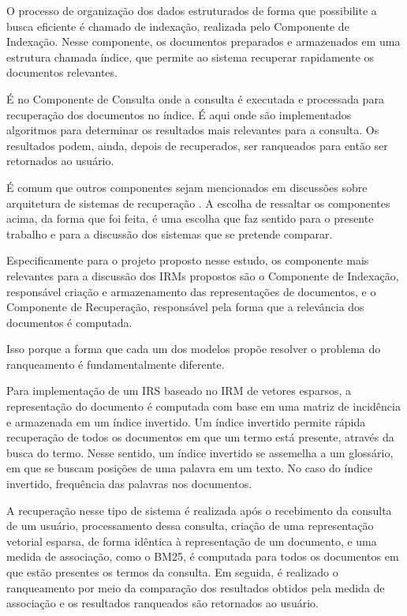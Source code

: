 \documentclass[
	12pt,				%
	openright,			%
	oneside,			%
	a4paper,			%
	english,			%
	french,				%
	spanish,			%
	brazil				%
	]{abntex2}
\begin{document}
O processo de organização dos dados estruturados de forma que possibilite a busca eficiente é chamado de indexação,
realizada pelo Componente de Indexação.
Nesse componente, os documentos preparados e armazenados em uma estrutura chamada índice, que permite ao sistema recuperar
rapidamente os documentos relevantes.

É no Componente de Consulta onde a consulta é executada e processada para recuperação dos documentos no índice.
É aqui onde são implementados algoritmos para determinar os resultados mais relevantes para a consulta.
Os resultados podem, ainda, depois de recuperados, ser ranqueados para então ser retornados ao usuário.

É comum que outros componentes sejam mencionados em discussões sobre arquitetura de sistemas de recuperação \cite{Ceri2013}. A escolha de ressaltar os componentes acima, da forma que foi feita, é uma escolha que faz sentido para o presente trabalho e para a discussão dos sistemas que se pretende comparar.

Especificamente para o projeto proposto nesse estudo, os componente mais relevantes para a discussão dos IRMs propostos são o Componente de Indexação, responsável criação e armazenamento das representações de documentos, e o Componente de Recuperação, responsável pela forma que a relevância dos documentos é computada.

Isso porque a forma que cada um dos modelos propõe resolver o problema do ranqueamento é fundamentalmente diferente.


Para implementação de um IRS baseado no IRM de vetores esparsos, a representação do documento é computada com base em uma matriz de incidência e armazenada em um índice invertido. Um índice invertido permite rápida recuperação de todos os documentos em que um termo está presente, através da busca do termo. Nesse sentido, um índice invertido se assemelha a um glossário, em que se buscam posições de uma palavra em um texto. No caso do índice invertido, frequência das palavras nos documentos.

A recuperação nesse tipo de sistema é realizada após o recebimento da consulta de um usuário, processamento dessa consulta, criação de uma representação vetorial esparsa, de forma idêntica à representação de um documento, e uma medida de associação, como o BM25, é computada para todos os documentos em que estão presentes os termos da consulta.
Em seguida, é realizado o ranqueamento por meio da comparação dos resultados obtidos pela medida de associação e os resultados ranqueados são retornados ao usuário.
\end{document}
